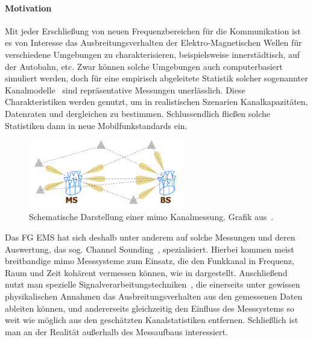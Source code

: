 %
\paragraph{Motivation}
%
%
Mit jeder Erschlie{\ss}ung von neuen Frequenzbereichen f\"ur die Kommunikation ist es von Interesse das Ausbreitungsverhalten der Elektro-Magnetischen Wellen f\"ur verschiedene Umgebungen zu charakterisieren, beispielsweise innerst\"adtisch, auf der Autobahn, etc. Zwar k\"onnen solche Umgebungen auch computerbasiert simuliert werden, doch f\"ur eine empirisch abgeleitete Statistik solcher sogenannter Kanalmodelle~\cite{delgaldo2007phd} sind repr\"asentative Messungen unerl\"asslich. Diese Charakteristiken werden genutzt, um in realistischen Szenarien Kanalkapazit\"aten, Datenraten und dergleichen zu bestimmen. Schlussendlich flie{\ss}en solche Statistiken dann in neue Mobilfunkstandards ein.

\begin{figure}
    \centering\includegraphics[width=0.6\textwidth]{img/eadf/sounding.png}
    \caption{Schematische Darstellung einer \acrshort{mimo} Kanalmessung. Grafik aus~\cite{richter_estimation_2005}.}\label{eadf_sounding}
\end{figure}

Das FG EMS hat sich deshalb unter anderem auf solche Messungen und deren Auswertung, das sog. Channel Sounding~\cite{thomae2005multidim_hrpe}, spezialisiert. Hierbei kommen meist breitbandige \gls{mimo} Messsysteme zum Einsatz, die den Funkkanal in Frequenz, Raum und Zeit koh\"arent vermessen k\"onnen, wie in  dargestellt. Anschlie{\ss}end nutzt man spezielle Signalverarbeitungstechniken~\cite{semper2023wideband_channel_sounding}, die einerseits unter gewissen physikalischen Annahmen das Ausbreitungsverhalten aus den gemessenen Daten ableiten k\"onnen, und andererseits gleichzeitig den Einfluss des Messsystems so weit wie m\"oglich aus den gesch\"atzten Kanalstatistiken entfernen. Schlie{\ss}lich ist man an der Realit\"at au{\ss}erhalb des Messaufbaus interessiert. 

